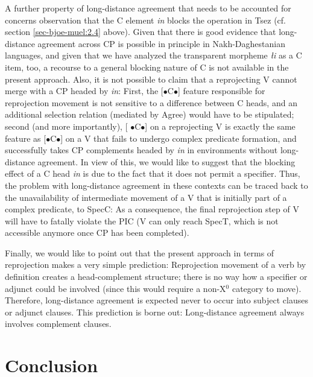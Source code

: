 \documentclass[output=paper
,modfonts
,nonflat]{langsci/langscibook}
\begin{document}
	\noindent A further property of long-distance agreement that needs to be
	accounted for concerns  observation
	that the C element {\itshape \textcrlambda in} blocks the operation in Tsez
	(cf. section \ref{sec-bjoe-muel:2.4} above). Given that there is good evidence that
	long-distance agreement across CP is possible in principle in
	Nakh-Daghestanian languages, and given that we have analyzed the
	transparent morpheme {\itshape {\l}i} as a C item, too, a recourse to a
	general blocking nature of C is not available in the present
	approach. Also, it is not possible to claim that a reprojecting V
	cannot merge with a CP headed by {\itshape \textcrlambda in}: First, the
	[{\small $\bullet$}C{\small $\bullet$}] feature responsible for
	reprojection movement is not sensitive to a difference between C
	heads, and an additional selection relation (mediated by Agree) would
	have to be stipulated; second (and more importantly), [{\small
		$\bullet$}C{\small $\bullet$}] on a reprojecting V is exactly the
	same feature as [{\small $\bullet$}C{\small $\bullet$}] on a V that
	fails to undergo complex predicate formation, and successfully takes
	CP complements headed by {\itshape \textcrlambda in} in environments
	without long-distance agreement. In view of this, we would like to
	suggest that the blocking effect of a C head {\itshape \textcrlambda in} is
	due to the fact that it does not permit a specifier. Thus, the problem
	with long-distance agreement in these contexts can be traced back to
	the unavailability of intermediate movement of a V that is initially
	part of a complex predicate, to SpecC: As a consequence, the final
	reprojection step of V will have to fatally violate the PIC (V
	can only reach SpecT, which is not accessible anymore once CP has been
	completed).
	
	Finally, we would like to point out that the present approach in terms
	of reprojection makes a very simple prediction: Reprojection movement
	of a verb by definition creates a head-complement structure; there is
	no way how a specifier or adjunct could be involved (since this would
	require a non-X$^0$ category to move). Therefore, long-distance
	agreement is expected never to occur into subject clauses or adjunct
	clauses.  This prediction is borne out: Long-distance agreement always
	involves complement clauses.
	
	
	\section{Conclusion} \label{sec-bjoe-muel:4}
	
\end{document}

